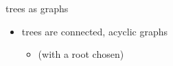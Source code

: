 \begin{frame}{trees as graphs}
\begin{itemize}
\item trees are connected, acyclic graphs
\begin{itemize}
\item (with a root chosen)
\end{itemize}
\end{itemize}
\end{frame}
